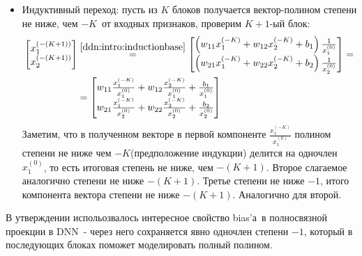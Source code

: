 \documentclass{report}
\begin{document}
\begin{tcolorbox}[title=Доказательство, breakable, enhanced]
\begin{itemize}
\begin{align}
\begin{bmatrix}
                w_{21}\frac{x_1^{(0)}}{x_2^{(0)}} + w_{22}+\frac{b_2}{x_2^{(0)}}
            \end{bmatrix}
        \end{align}
        полученные векторы есть полиномы степени не ниже, чем $-1$. \textbf{Важно}, что благодаря \color{magenta}bias'у\color{black}\ в полносвязной проекции сохраняет одночлен степени $-1$, что пригодится далее;
        \item Индуктивный переход: \color{ForestGreen}пусть из $K$ блоков получается вектор-полином степени не ниже, чем $-K$\color{black}\ от входных признаков, проверим $K+1$-ый блок:
        \begin{align}
            \begin{bmatrix}
                x_1^{(-(K+1))}\\
                x_2^{(-(K+1))}
            \end{bmatrix}
            &\overset{\ref{ddn:intro:inductionbase}}{=}
            \begin{bmatrix}
                \left(w_{11}x_1^{(-K)} + w_{12}x_2^{(-K)}+b_1\right)\frac{1}{x_1^{(0)}}\\
                \left(w_{21}x_1^{(-K)} + w_{22}x_2^{(-K)}+b_2\right)\frac{1}{x_2^{(0)}}
            \end{bmatrix} = \\
            &=\begin{bmatrix}
                w_{11}\frac{x_1^{(-K)}}{x_1^{(0)}} + w_{12}\frac{x_2^{(-K)}}{x_1^{(0)}}+\frac{b_1}{x_1^{(0)}}\\
                w_{21}\frac{x_1^{(-K)}}{x_2^{(0)}} + w_{22}\frac{x_2^{(-K)}}{x_2^{(0)}}+\frac{b_2}{x_2^{(0)}}
            \end{bmatrix}
        \end{align}
        Заметим, что в полученном векторе в первой компоненте $\frac{x_1^{(-K)}}{x_1^{(0)}}$ 
        полином степени не ниже чем $-K$(\color{ForestGreen}предположение индукции\color{black}) 
        делится на одночлен $x_1^{(0)}$, то есть итоговая степень не ниже, чем $-(K+1)$. 
        Второе слагаемое аналогично степени не ниже $-(K+1)$. 
        Третье степени не ниже $-1$, итого компонента вектора степени не ниже $-(K+1)$. Аналогично для второй. \qedsymbol
    \end{itemize}
\end{tcolorbox}

\par В утверждении испольозвалось интересное свойство \color{magenta}bias'а\color{black}\ в 
полносвязной проекции в \color{PineGreen}DNN\color{black}\ - 
через него сохраняется явно одночлен степени $-1$, 
который в последующих блоках поможет моделировать полный полином.
\end{document}
